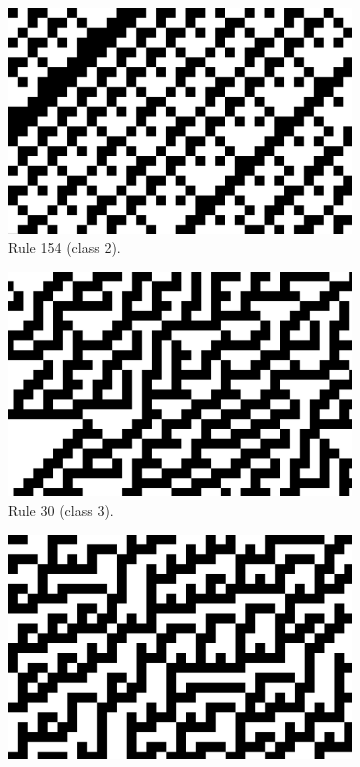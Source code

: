 \documentclass[12pt]{article}
\begin{document}
\begin{figure} [!h]
\begin{subfigure}{.5\textwidth}
  \centering
  \includegraphics[width=.9\linewidth]{rule154-zoomed}
  \caption{Rule 154 (class 2).}
  \label{fig:rule154-zoomed}
 \end{subfigure}%
\begin{subfigure}{.5\textwidth}
  \centering
  \includegraphics[width=.9\linewidth]{rule30-zoomed}
  \caption{Rule 30 (class 3).}
  \label{fig:rule30-zoomed}
\end{subfigure}
\begin{subfigure}{.5\textwidth}
  \centering
  \includegraphics[width=.9\linewidth]{rule45-zoomed}

\end{subfigure}
\end{figure}
\end{document}
